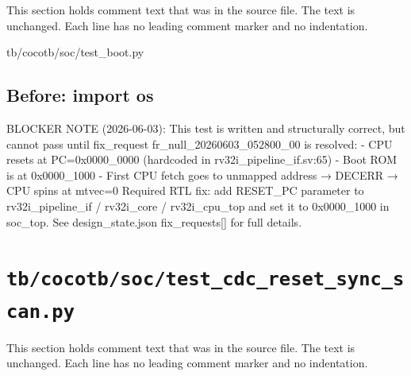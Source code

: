This section holds comment text that was in the source file. The text is unchanged. Each line has no leading comment marker and no indentation.

\begin{relocated}{tb/cocotb/soc/test_boot.py}

\subsection*{Before: import os}

\begin{textblock}
BLOCKER NOTE (2026-06-03):
This test is written and structurally correct, but cannot pass until
fix_request fr_null_20260603_052800_00 is resolved:
- CPU resets at PC=0x0000_0000 (hardcoded in rv32i_pipeline_if.sv:65)
- Boot ROM is at 0x0000_1000
- First CPU fetch goes to unmapped address → DECERR → CPU spins at mtvec=0
Required RTL fix: add RESET_PC parameter to rv32i_pipeline_if / rv32i_core /
rv32i_cpu_top and set it to 0x0000_1000 in soc_top.
See design_state.json fix_requests[] for full details.
\end{textblock}

\end{relocated}

\section{\texttt{tb/cocotb/soc/test\_cdc\_reset\_sync\_scan.py}}\label{tm:suite:soc-test-cdc-reset-sync-scan}

This section holds comment text that was in the source file. The text is unchanged. Each line has no leading comment marker and no indentation.

